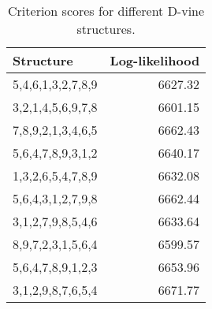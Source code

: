 \begin{table}[H]

\caption{Criterion scores for different D-vine structures.}
\centering
\fontsize{11}{13}\selectfont
\begin{tabular}[t]{lr}
\toprule
Structure & Log-likelihood\\
\midrule
5,4,6,1,3,2,7,8,9 & 6627.32\\
3,2,1,4,5,6,9,7,8 & 6601.15\\
7,8,9,2,1,3,4,6,5 & 6662.43\\
5,6,4,7,8,9,3,1,2 & 6640.17\\
1,3,2,6,5,4,7,8,9 & 6632.08\\
5,6,4,3,1,2,7,9,8 & 6662.44\\
3,1,2,7,9,8,5,4,6 & 6633.64\\
8,9,7,2,3,1,5,6,4 & 6599.57\\
5,6,4,7,8,9,1,2,3 & 6653.96\\
3,1,2,9,8,7,6,5,4 & 6671.77\\
\bottomrule
\end{tabular}
\end{table}
